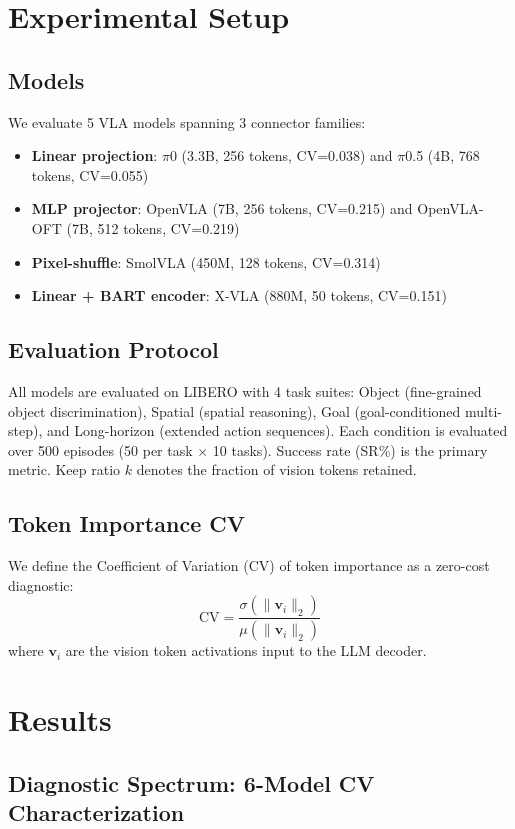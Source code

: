 \documentclass[letterpaper]{article}
\begin{document}
\section{Experimental Setup}

\subsection{Models}
We evaluate 5 VLA models spanning 3 connector families:
\begin{itemize}
\item \textbf{Linear projection}: $\pi$0 (3.3B, 256 tokens, CV=0.038) and $\pi$0.5 (4B, 768 tokens, CV=0.055)
\item \textbf{MLP projector}: OpenVLA (7B, 256 tokens, CV=0.215) and OpenVLA-OFT (7B, 512 tokens, CV=0.219)
\item \textbf{Pixel-shuffle}: SmolVLA (450M, 128 tokens, CV=0.314)
\item \textbf{Linear + BART encoder}: X-VLA (880M, 50 tokens, CV=0.151)
\end{itemize}

\subsection{Evaluation Protocol}
All models are evaluated on LIBERO with 4 task suites: Object (fine-grained object discrimination), Spatial (spatial reasoning), Goal (goal-conditioned multi-step), and Long-horizon (extended action sequences).
Each condition is evaluated over 500 episodes (50 per task $\times$ 10 tasks).
Success rate (SR\%) is the primary metric.
Keep ratio $k$ denotes the fraction of vision tokens retained.

\subsection{Token Importance CV}
We define the Coefficient of Variation (CV) of token importance as a zero-cost diagnostic:
\begin{equation}
\text{CV} = \frac{\sigma(\|\mathbf{v}_i\|_2)}{\mu(\|\mathbf{v}_i\|_2)}
\end{equation}
where $\mathbf{v}_i$ are the vision token activations input to the LLM decoder.

\section{Results}

\subsection{Diagnostic Spectrum: 6-Model CV Characterization}
\end{document}
